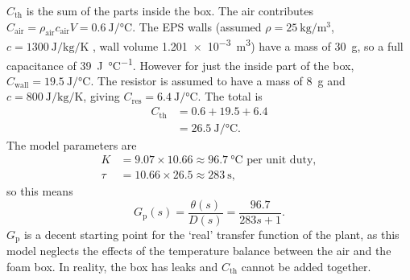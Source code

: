 \documentclass[10pt, a4paper, twocolumn]{article}
\newcommand{\upsub}[1]{_{\mathrm{#1}}}
\begin{document}
	$C\upsub{th}$ is the sum of the parts inside the box. The air contributes $C\upsub{air} = \rho\upsub{air}c\upsub{air}V = \qty{0.6}{\joule\per\degreeCelsius}$. The EPS walls (assumed $\rho = \qty{25}{\kilogram\per\meter\cubed}$, $c = \qty{1300}{\joule\per\kilogram\per\kelvin}$ \cite{Haynes2016}, wall volume \qty{1.201e-3}{\meter\cubed}) have a mass of \qty{30}{\gram}, so a full capacitance of \qty{39}{\joule\per\degreeCelsius}. However for just the inside part of the box, $C\upsub{wall} = \qty{19.5}{\joule\per\degreeCelsius}$. The resistor is assumed to have a mass of \qty{8}{\gram} and $c = \qty{800}{\joule\per\kilogram\per\kelvin}$, giving $C\upsub{res} = \qty{6.4}{\joule\per\degreeCelsius}$. The total is
	\begin{equation}
		\begin{aligned}
			C\upsub{th} &= 0.6 + 19.5 + 6.4 \\
			&= \qty{26.5}{\joule\per\degreeCelsius}.
		\end{aligned}
	\end{equation}
	The model parameters are
	\begin{equation}
		\begin{aligned}
			K &= 9.07 \times 10.66 \approx \qty{96.7}{\degreeCelsius}\text{ per unit duty}, \\
			\tau &= 10.66 \times 26.5 \approx \qty{283}{\second},
		\end{aligned}
	\end{equation}
	so this means
	\begin{equation}
		G\upsub{p}(s) = \frac{\theta(s)}{D(s)} = \frac{96.7}{283s + 1}.
	\end{equation}
	$G\upsub{p}$ is a decent starting point for the `real' transfer function of the plant, as this model neglects the effects of the temperature balance between the air and the foam box. In reality, the box has leaks and $C\upsub{th}$ cannot be added together.
	
\end{document}
